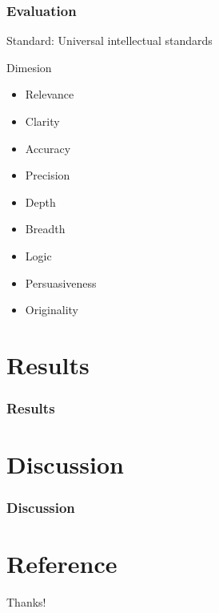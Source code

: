 \documentclass{beamer}
\begin{document}
\begin{frame}
    \frametitle{Evaluation}
    \Large{Standard: Universal intellectual standards}
    \begin{block}{Dimesion}
        \begin{multicols}{2}
            \begin{itemize}
                \item Relevance
                \item Clarity
                \item Accuracy
                \item Precision
                \item Depth
                \item Breadth
                \item Logic
                \item Persuasiveness
                \item Originality
            \end{itemize}
        \end{multicols}
    \end{block}

\end{frame}

\section{Results}
\begin{frame}
    \frametitle{Results}
\end{frame}

\section{Discussion}
\begin{frame}
    \frametitle{Discussion}
\end{frame}

\section{Reference}

\begin{frame}[allowframebreaks]
    
    
\end{frame}

\begin{frame}
    \begin{center}
        {\Huge\calligra Thanks!}\cite{origin}
    \end{center}
\end{frame}
\end{document}
